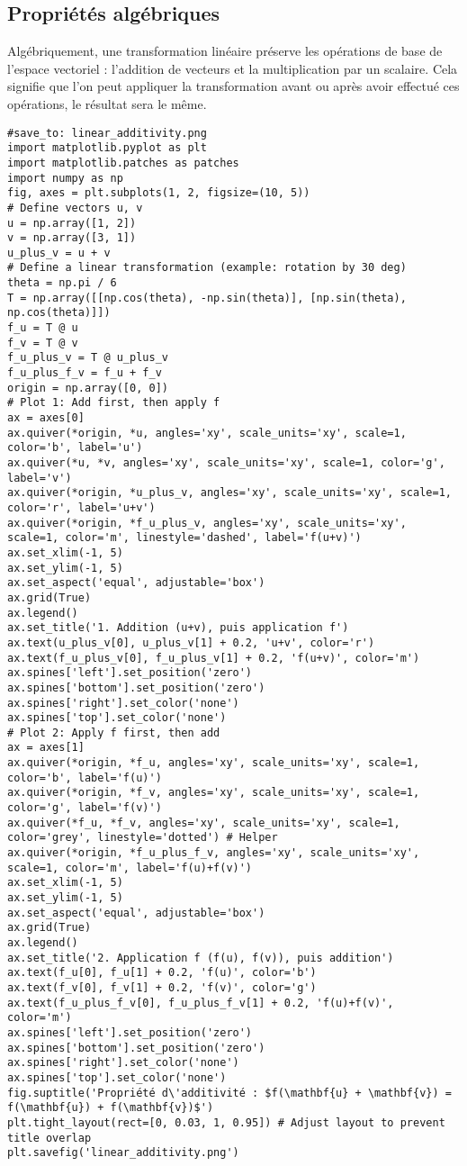 \subsection{Propriétés algébriques}
Algébriquement, une transformation linéaire préserve les opérations de base de l'espace vectoriel : l'addition de vecteurs et la multiplication par un scalaire. Cela signifie que l'on peut appliquer la transformation avant ou après avoir effectué ces opérations, le résultat sera le même.
\begin{verbatim}
#save_to: linear_additivity.png
import matplotlib.pyplot as plt
import matplotlib.patches as patches
import numpy as np
fig, axes = plt.subplots(1, 2, figsize=(10, 5))
# Define vectors u, v
u = np.array([1, 2])
v = np.array([3, 1])
u_plus_v = u + v
# Define a linear transformation (example: rotation by 30 deg)
theta = np.pi / 6
T = np.array([[np.cos(theta), -np.sin(theta)], [np.sin(theta), np.cos(theta)]])
f_u = T @ u
f_v = T @ v
f_u_plus_v = T @ u_plus_v
f_u_plus_f_v = f_u + f_v
origin = np.array([0, 0])
# Plot 1: Add first, then apply f
ax = axes[0]
ax.quiver(*origin, *u, angles='xy', scale_units='xy', scale=1, color='b', label='u')
ax.quiver(*u, *v, angles='xy', scale_units='xy', scale=1, color='g', label='v')
ax.quiver(*origin, *u_plus_v, angles='xy', scale_units='xy', scale=1, color='r', label='u+v')
ax.quiver(*origin, *f_u_plus_v, angles='xy', scale_units='xy', scale=1, color='m', linestyle='dashed', label='f(u+v)')
ax.set_xlim(-1, 5)
ax.set_ylim(-1, 5)
ax.set_aspect('equal', adjustable='box')
ax.grid(True)
ax.legend()
ax.set_title('1. Addition (u+v), puis application f')
ax.text(u_plus_v[0], u_plus_v[1] + 0.2, 'u+v', color='r')
ax.text(f_u_plus_v[0], f_u_plus_v[1] + 0.2, 'f(u+v)', color='m')
ax.spines['left'].set_position('zero')
ax.spines['bottom'].set_position('zero')
ax.spines['right'].set_color('none')
ax.spines['top'].set_color('none')
# Plot 2: Apply f first, then add
ax = axes[1]
ax.quiver(*origin, *f_u, angles='xy', scale_units='xy', scale=1, color='b', label='f(u)')
ax.quiver(*origin, *f_v, angles='xy', scale_units='xy', scale=1, color='g', label='f(v)')
ax.quiver(*f_u, *f_v, angles='xy', scale_units='xy', scale=1, color='grey', linestyle='dotted') # Helper
ax.quiver(*origin, *f_u_plus_f_v, angles='xy', scale_units='xy', scale=1, color='m', label='f(u)+f(v)')
ax.set_xlim(-1, 5)
ax.set_ylim(-1, 5)
ax.set_aspect('equal', adjustable='box')
ax.grid(True)
ax.legend()
ax.set_title('2. Application f (f(u), f(v)), puis addition')
ax.text(f_u[0], f_u[1] + 0.2, 'f(u)', color='b')
ax.text(f_v[0], f_v[1] + 0.2, 'f(v)', color='g')
ax.text(f_u_plus_f_v[0], f_u_plus_f_v[1] + 0.2, 'f(u)+f(v)', color='m')
ax.spines['left'].set_position('zero')
ax.spines['bottom'].set_position('zero')
ax.spines['right'].set_color('none')
ax.spines['top'].set_color('none')
fig.suptitle('Propriété d\'additivité : $f(\mathbf{u} + \mathbf{v}) = f(\mathbf{u}) + f(\mathbf{v})$')
plt.tight_layout(rect=[0, 0.03, 1, 0.95]) # Adjust layout to prevent title overlap
plt.savefig('linear_additivity.png')
\end{verbatim}
